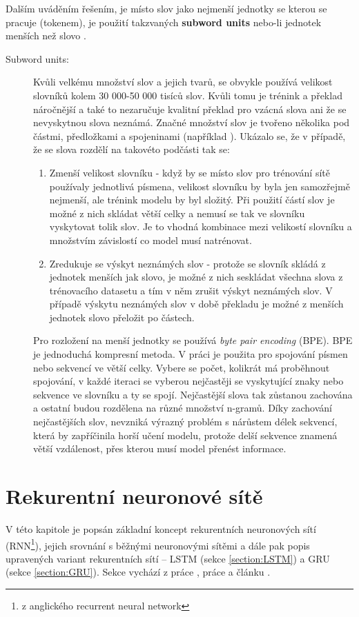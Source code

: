 Dalším uváděním řešením, je místo slov jako nejmenší jednotky se kterou se pracuje (tokenem), je použití takzvaných \textbf{subword units} nebo-li jednotek menších než slovo \cite{subwords}.

\begin{description}
  \item[Subword units:]\label{subsection:subwords} Kvůli velkému množství slov a jejich tvarů, se obvykle používá velikost slovníků kolem 30 000-50 000 tisíců slov. Kvůli tomu je trénink a překlad náročnější a také to nezaručuje kvalitní překlad pro vzácná slova ani že se nevyskytnou slova neznámá. Značné množství slov je tvořeno několika pod částmi, předložkami a spojeninami (například ). Ukázalo se, že v případě, že se slova rozdělí na takovéto podčásti tak se:

      \begin{enumerate}
        \item Zmenší velikost slovníku - když by se místo slov pro trénování sítě používaly jednotlivá písmena, velikost slovníku by byla jen samozřejmě nejmenší, ale trénink modelu by byl složitý. Při použití částí slov je možné z nich skládat větší celky a nemusí se tak ve slovníku vyskytovat tolik slov. Je to vhodná kombinace mezi velikostí slovníku a množstvím závislostí co model musí natrénovat.
        \item Zredukuje se výskyt neznámých slov - protože se slovník skládá z jednotek menších jak slovo, je možné z nich seskládat všechna slova z trénovacího datasetu a tím v něm zrušit výskyt neznámých slov. V případě výskytu neznámých slov v době překladu je možné z menších jednotek slovo přeložit po částech.
      \end{enumerate}

      Pro rozložení na menší jednotky se používá \emph{byte pair encoding} (BPE). BPE je jednoduchá kompresní metoda. V práci \cite{subwords} je použita pro spojování písmen nebo sekvencí ve větší celky. Vybere se počet, kolikrát má proběhnout spojování, v každé iteraci se vyberou nejčastěji se vyskytující znaky nebo sekvence ve slovníku a ty se spojí. Nejčastější slova tak zůstanou zachována a ostatní budou rozdělena na různé množství n-gramů. Díky zachování nejčastějších slov, nevzniká výrazný problém s nárůstem délek sekvencí, která by zapříčinila horší učení modelu, protože delší sekvence znamená větší vzdálenost, přes kterou musí model přenést informace.
\end{description}

\section{Rekurentní neuronové sítě}\label{section:rnn}
V této kapitole je popsán základní koncept rekurentních neuronových sítí (RNN\footnote{z anglického recurrent neural network}), jejich srovnání s běžnými neuronovými sítěmi a dále pak popis upravených variant rekurentních sítí -- LSTM (sekce \ref{section:LSTM}) a GRU (sekce \ref{section:GRU}). Sekce vychází z práce \cite{nmtThesis}, práce \cite{nmtTutorial} a článku \cite{understandingLSTM}.


